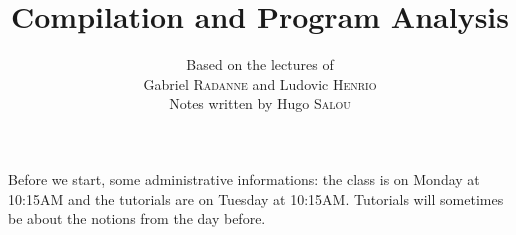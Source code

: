 \documentclass{../notes-en}
\title{Compilation and Program Analysis}
\author{Based on the lectures of\\ Gabriel \textsc{Radanne} and Ludovic \textsc{Henrio} \\ Notes written by Hugo \textsc{Salou}}
\begin{document}
  \maketitle

  \dominitoc
  \tableofcontents

  \pagebreak

  Before we start, some administrative informations: the class is on Monday at 10:15AM and the tutorials are on Tuesday at 10:15AM.
  Tutorials will sometimes be about the notions from the day before.

  
\end{document}
